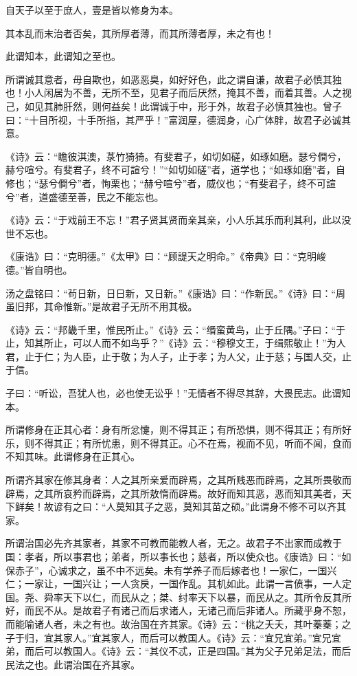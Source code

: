 \documentclass[]{article}
\begin{document}
自天子以至于庶人，壹是皆以修身为本。

其本乱而末治者否矣，其所厚者薄，而其所薄者厚，未之有也！

此谓知本，此谓知之至也。

所谓诚其意者，毋自欺也，如恶恶臭，如好好色，此之谓自谦，故君子必慎其独也！小人闲居为不善，无所不至，见君子而后厌然，掩其不善，而着其善。人之视己，如见其肺肝然，则何益矣！此谓诚于中，形于外，故君子必慎其独也。曾子曰：``十目所视，十手所指，其严乎！''富润屋，德润身，心广体胖，故君子必诚其意。

《诗》云：``瞻彼淇澳，菉竹猗猗。有斐君子，如切如磋，如琢如磨。瑟兮僴兮，赫兮喧兮。有斐君子，终不可諠兮！''``如切如磋''者，道学也；``如琢如磨''者，自修也；``瑟兮僴兮''者，恂栗也；``赫兮喧兮''者，威仪也；``有斐君子，终不可諠兮''者，道盛德至善，民之不能忘也。

《诗》云：``于戏前王不忘！''君子贤其贤而亲其亲，小人乐其乐而利其利，此以没世不忘也。

《康诰》曰：``克明德。''《太甲》曰：``顾諟天之明命。''《帝典》曰：``克明峻德。''皆自明也。

汤之盘铭曰：``茍日新，日日新，又日新。''《康诰》曰：``作新民。''《诗》曰：``周虽旧邦，其命惟新。''是故君子无所不用其极。

《诗》云：``邦畿千里，惟民所止。''《诗》云：``缗蛮黄鸟，止于丘隅。''子曰：``于止，知其所止，可以人而不如鸟乎？''《诗》云：``穆穆文王，于缉熙敬止！''为人君，止于仁；为人臣，止于敬；为人子，止于孝；为人父，止于慈；与国人交，止于信。

子曰：``听讼，吾犹人也，必也使无讼乎！''无情者不得尽其辞，大畏民志。此谓知本。

所谓修身在正其心者：身有所忿懥，则不得其正；有所恐惧，则不得其正；有所好乐，则不得其正；有所忧患，则不得其正。心不在焉，视而不见，听而不闻，食而不知其味。此谓修身在正其心。

所谓齐其家在修其身者：人之其所亲爱而辟焉，之其所贱恶而辟焉，之其所畏敬而辟焉，之其所哀矜而辟焉，之其所敖惰而辟焉。故好而知其恶，恶而知其美者，天下鲜矣！故谚有之曰：``人莫知其子之恶，莫知其苗之硕。''此谓身不修不可以齐其家。

所谓治国必先齐其家者，其家不可教而能教人者，无之。故君子不出家而成教于国：孝者，所以事君也；弟者，所以事长也；慈者，所以使众也。《康诰》曰：``如保赤子''，心诚求之，虽不中不远矣。未有学养子而后嫁者也！一家仁，一国兴仁；一家让，一国兴让；一人贪戾，一国作乱。其机如此。此谓一言偾事，一人定国。尧、舜率天下以仁，而民从之；桀、纣率天下以暴，而民从之。其所令反其所好，而民不从。是故君子有诸己而后求诸人，无诸己而后非诸人。所藏乎身不恕，而能喻诸人者，未之有也。故治国在齐其家。《诗》云：``桃之夭夭，其叶蓁蓁；之子于归，宜其家人。''宜其家人，而后可以教国人。《诗》云：``宜兄宜弟。''宜兄宜弟，而后可以教国人。《诗》云：``其仪不忒，正是四国。''其为父子兄弟足法，而后民法之也。此谓治国在齐其家。
\end{document}
